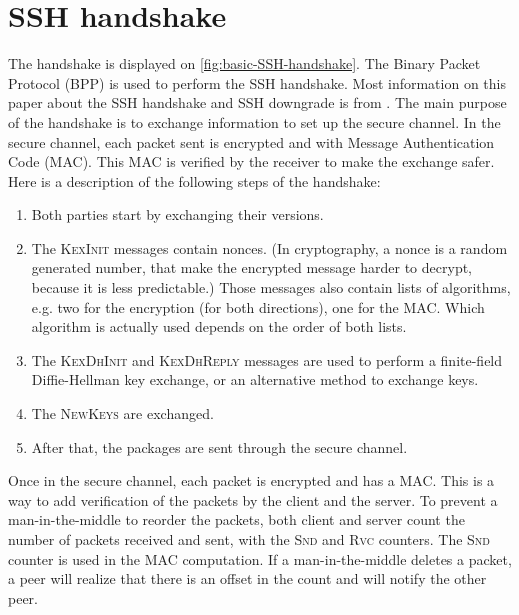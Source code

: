 \documentclass[journal=tches,final]{iacrtrans}
\begin{document}
\section{SSH handshake}
\label{sec:SSH-handshake}

The handshake is displayed on \autoref{fig:basic-SSH-handshake}. The Binary Packet Protocol (BPP) is used to perform the SSH handshake. Most information on this paper about the SSH handshake and SSH downgrade is from \cite{terrapin-attack}. The main purpose of the handshake is to exchange information to set up the secure channel. In the secure channel, each packet sent is encrypted and with Message Authentication Code (MAC). This MAC is verified by the receiver to make the exchange safer. Here is a description of the following steps of the handshake:

\begin{enumerate}

    \item Both parties start by exchanging their versions.
    
    \item The \textsc{KexInit} messages contain nonces. (In cryptography, a nonce is a random generated number, that make the encrypted message harder to decrypt, because it is less predictable.) Those messages also contain lists of algorithms, e.g. two for the encryption (for both directions), one for the MAC. Which algorithm is actually used depends on the order of both lists. 
    
    \item The \textsc{KexDhInit} and \textsc{KexDhReply} messages are used to perform a finite-field Diffie-Hellman key exchange, or an alternative method to exchange keys.
    
    \item The \textsc{NewKeys} are exchanged.

    \item After that, the packages are sent through the secure channel.
    
\end{enumerate} 

Once in the secure channel, each packet is encrypted and has a MAC. This is a way to add verification of the packets by the client and the server. To prevent a man-in-the-middle to reorder the packets, both client and server count the number of packets received and sent, with the \textsc{Snd} and \textsc{Rvc} counters. The \textsc{Snd} counter is used in the MAC computation. If a man-in-the-middle deletes a packet, a peer will realize that there is an offset in the count and will notify the other peer.
\end{document}
